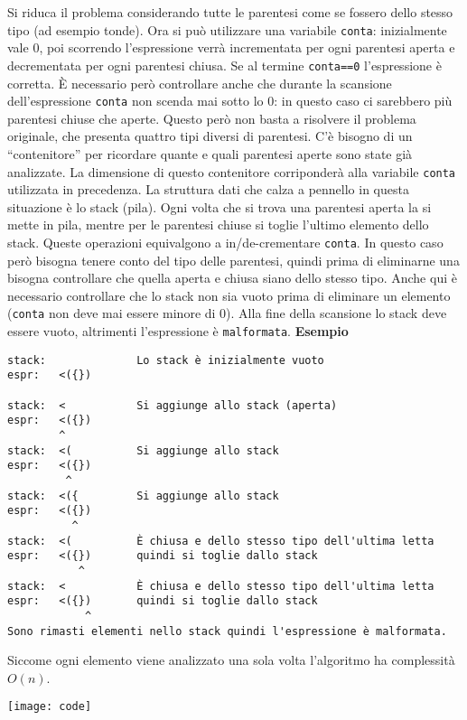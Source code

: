 \SolN
Si riduca il problema considerando tutte le parentesi come se fossero dello stesso tipo (ad esempio tonde). Ora si può utilizzare una variabile \texttt{conta}: inizialmente vale $0$, poi scorrendo l'espressione verrà incrementata per ogni parentesi aperta e decrementata per ogni parentesi chiusa.\newline
Se al termine \texttt{conta==0} l'espressione è corretta. È necessario però controllare anche che durante la scansione dell'espressione \texttt{conta} non scenda mai sotto lo $0$: in questo caso ci sarebbero più parentesi chiuse che aperte.\newline
\newline
Questo però non basta a risolvere il problema originale, che presenta quattro tipi diversi di parentesi. C'è bisogno di un ``contenitore'' per ricordare quante e quali parentesi aperte sono state già analizzate. La dimensione di questo contenitore corriponderà alla variabile \texttt{conta} utilizzata in precedenza.\newline
La struttura dati che calza a pennello in questa situazione è lo stack (pila).\newline
Ogni volta che si trova una parentesi aperta la si mette in pila, mentre per le parentesi chiuse si toglie l'ultimo elemento dello stack. Queste operazioni equivalgono a in/de-crementare \texttt{conta}. In questo caso però bisogna tenere conto del tipo delle parentesi, quindi prima di eliminarne una bisogna controllare che quella aperta e chiusa siano dello stesso tipo.\newline
Anche qui è necessario controllare che lo stack non sia vuoto prima di eliminare un elemento (\texttt{conta} non deve mai essere minore di 0).\newline
Alla fine della scansione lo stack deve essere vuoto, altrimenti l'espressione è \texttt{malformata}.\newline
\newline
\textbf{Esempio}
\begin{verbatim}
stack:              Lo stack è inizialmente vuoto
espr:   <({})

stack:  <           Si aggiunge allo stack (aperta)
espr:   <({})
        ^
stack:  <(          Si aggiunge allo stack
espr:   <({})
         ^
stack:  <({         Si aggiunge allo stack
espr:   <({})
          ^
stack:  <(          È chiusa e dello stesso tipo dell'ultima letta
espr:   <({})       quindi si toglie dallo stack
           ^
stack:  <           È chiusa e dello stesso tipo dell'ultima letta
espr:   <({})       quindi si toglie dallo stack
            ^
Sono rimasti elementi nello stack quindi l'espressione è malformata.
\end{verbatim}

Siccome ogni elemento viene analizzato una sola volta l'algoritmo ha complessità $O(n)$.

\Codice

\texttt{[image: code]}
